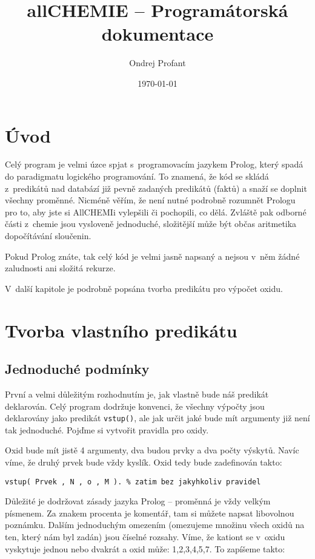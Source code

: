 \documentclass[a4paper]{article}
\title{allCHEMIE -- Programátorská dokumentace}
\author{Ondrej Profant}
\date{\today}
\begin{document}
\maketitle
\newpage
\tableofcontents
\newpage
\section{Úvod}
Celý program je velmi úzce spjat s~programovacím jazykem Prolog, který spadá do paradigmatu logického programování.
To znamená, že kód se skládá z~predikátů nad databází již pevně zadaných predikátů (faktů) a snaží se doplnit všechny proměnné. 
Nicméně věřím, že není nutné podrobně rozumnět Prologu pro to, aby jste si AllCHEMIi vylepšili či pochopili, co dělá.
Zvláště pak odborné části z~chemie jsou vysloveně jednoduché, složitější může být občas aritmetika dopočítávání sloučenin. 

Pokud Prolog znáte, tak celý kód je velmi jasně napsaný a nejsou v~něm žádné zaludnosti ani složitá rekurze.

V~další kapitole je podrobně popsána tvorba predikátu pro výpočet oxidu.
\section{Tvorba vlastního predikátu} 
\subsection{Jednoduché podmínky}
První a velmi důležitým rozhodnutím je, jak vlastně bude náš predikát deklarován. 
Celý program dodržuje konvenci, že všechny výpočty jsou deklarovány jako predikát \texttt{vstup()}, ale
jak určit jaké bude mít argumenty již není tak jednoduché. Pojďme si vytvořit pravidla pro oxidy.

Oxid bude mít jistě 4 argumenty, dva budou prvky a dva počty výskytů. Navíc víme, že druhý prvek bude vždy
kyslík. Oxid tedy bude zadefinován takto:

\begin{verbatim}
vstup( Prvek , N , o , M ). % zatim bez jakyhkoliv pravidel
\end{verbatim}

Důležité je dodržovat zásady jazyka Prolog -- proměnná je vždy velkým písmenem. Za znakem procenta je komentář, tam
si můžete napsat libovolnou poznámku. Dalším jednoduchým omezením (omezujeme množinu všech oxidů na ten, který nám byl zadán)
jsou číselné rozsahy. Víme, že kationt se v~oxidu vyskytuje jednou nebo dvakrát a oxid může: 1,2,3,4,5,7. 
To zapíšeme takto:
\end{document}
